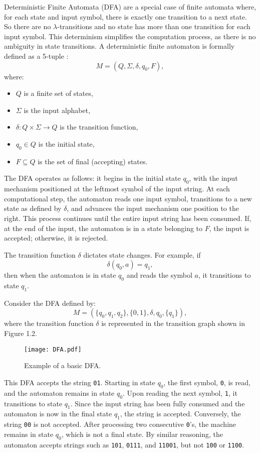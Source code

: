 Deterministic Finite Automata (DFA) are a special case of finite automata where, for each state and input symbol, there is exactly one transition to a next state.
So there are no \(\lambda\)-transitions and no state has more than one transition for each input symbol.
This determinism simplifies the computation process, as there is no ambiguity in state transitions.
A deterministic finite automaton is formally defined as a 5-tuple \cite{linz2011formal}:
\[
M = (Q, \Sigma, \delta, q_0, F),
\]
where:
\begin{itemize}
    \item \(Q\) is a finite set of  states,
    \item \(\Sigma\) is the input alphabet,
    \item \(\delta : Q \times \Sigma \rightarrow Q\) is the transition function,
    \item \(q_0 \in Q\) is the initial state,
    \item \(F \subseteq Q\) is the set of final (accepting) states.
\end{itemize}
The DFA operates as follows: it begins in the initial state \(q_0\), 
with the input mechanism positioned at the leftmost symbol of the input string. At each computational step, 
the automaton reads one input symbol, transitions to a new state as defined by \(\delta\), 
and advances the input mechanism one position to the right. This process continues until the entire input string has been consumed. 
If, at the end of the input, the automaton is in a state belonging to \(F\), the input is accepted; otherwise, it is rejected.

The transition function \(\delta\) dictates state changes. For example, if
\[
\delta(q_0, a) = q_1,
\]
then when the automaton is in state \(q_0\) and reads the symbol \(a\), it transitions to state \(q_1\).

Consider the DFA defined by:
\[
M = (\{q_0, q_1, q_2\}, \{0, 1\}, \delta, q_0, \{q_1\}),
\]
where the transition function \(\delta\) is represented in the transition graph shown in Figure 1.2.

\begin{figure}[htbp]
    \centering
    \texttt{[image: DFA.pdf]}
    \caption{Example of a basic DFA.}
    \label{fig:2}
\end{figure}

This DFA accepts the string \texttt{01}. Starting in state \(q_0\), the first symbol, \texttt{0}, is read, and the automaton remains in state \(q_0\). 
Upon reading the next symbol, \texttt{1}, it transitions to state \(q_1\). 
Since the input string has been fully consumed and the automaton is now in the final state \(q_1\), the string is accepted.
Conversely, the string \texttt{00} is not accepted. After processing two consecutive \texttt{0}'s, the machine remains in state \(q_0\), which is not a final state.
By similar reasoning, the automaton accepts strings such as \texttt{101}, \texttt{0111}, and \texttt{11001}, but not \texttt{100} or \texttt{1100}.

